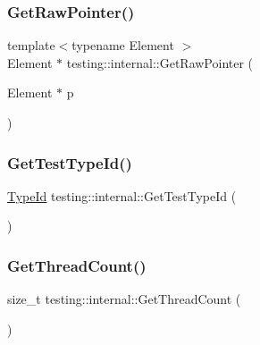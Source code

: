 \mbox{\label{namespacetesting_1_1internal_ae9f6499f55e30ff23f9ed914fb8ad597}} 
\subsubsection{\texorpdfstring{GetRawPointer()}{GetRawPointer()}\hspace{0.1cm}{\footnotesize\ttfamily [2/2]}}
{\footnotesize\ttfamily template$<$typename Element $>$ \\
Element $\ast$ testing\+::internal\+::\+Get\+Raw\+Pointer (\begin{DoxyParamCaption}\item[{Element $\ast$}]{p }\end{DoxyParamCaption})\hspace{0.3cm}{\ttfamily [inline]}}

\mbox{\label{namespacetesting_1_1internal_ad0d66d56ead224263cd100c1d6bfc562}} 
\subsubsection{\texorpdfstring{GetTestTypeId()}{GetTestTypeId()}}
{\footnotesize\ttfamily \mbox{\hyperlink{namespacetesting_1_1internal_a38c435cbab5f8b784e2e7f3356cab242}{Type\+Id}} testing\+::internal\+::\+Get\+Test\+Type\+Id (\begin{DoxyParamCaption}{ }\end{DoxyParamCaption})}

\mbox{\label{namespacetesting_1_1internal_a3b9b3649cd04558bf46c75de52a7ef34}} 
\subsubsection{\texorpdfstring{GetThreadCount()}{GetThreadCount()}}
{\footnotesize\ttfamily size\+\_\+t testing\+::internal\+::\+Get\+Thread\+Count (\begin{DoxyParamCaption}{ }\end{DoxyParamCaption})}

